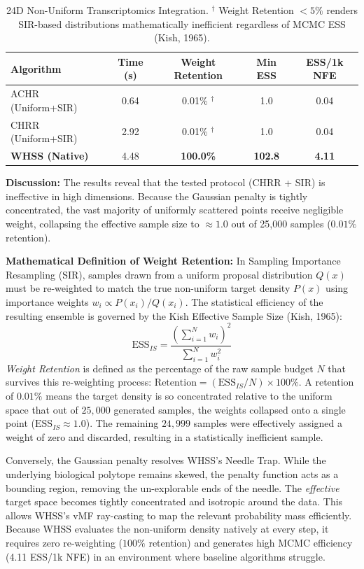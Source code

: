 \documentclass[12pt]{article}
\begin{document}
\begin{table}[H]
\centering
\begin{tabular}{l|ccc|c}
\toprule
\textbf{Algorithm} & \textbf{Time (s)} & \textbf{Weight Retention} & \textbf{Min ESS} & \textbf{ESS/1k NFE} \\
\midrule
ACHR (Uniform+SIR) & 0.64 & 0.01\% $^\dagger$ & 1.0 & 0.04 \\
CHRR (Uniform+SIR) & 2.92 & 0.01\% $^\dagger$ & 1.0 & 0.04 \\
\textbf{WHSS (Native)} & 4.48 & \textbf{100.0\%} & \textbf{102.8} & \textbf{4.11} \\
\bottomrule
\end{tabular}
\caption{24D Non-Uniform Transcriptomics Integration. $^\dagger$ Weight Retention $<5\%$ renders SIR-based distributions mathematically inefficient regardless of MCMC ESS (Kish, 1965).}
\end{table}

\textbf{Discussion:} The results reveal that the tested protocol (CHRR + SIR) is ineffective in high dimensions. Because the Gaussian penalty is tightly concentrated, the vast majority of uniformly scattered points receive negligible weight, collapsing the effective sample size to $\approx 1.0$ out of 25,000 samples ($0.01\%$ retention). 

\textbf{Mathematical Definition of Weight Retention:}
In Sampling Importance Resampling (SIR), samples drawn from a uniform proposal distribution $Q(x)$ must be re-weighted to match the true non-uniform target density $P(x)$ using importance weights $w_i \propto P(x_i)/Q(x_i)$. The statistical efficiency of the resulting ensemble is governed by the Kish Effective Sample Size (Kish, 1965):
\[
\text{ESS}_{IS} = \frac{\left(\sum_{i=1}^N w_i\right)^2}{\sum_{i=1}^N w_i^2}
\]
\emph{Weight Retention} is defined as the percentage of the raw sample budget $N$ that survives this re-weighting process: $\text{Retention} = (\text{ESS}_{IS} / N) \times 100\%$. 
A retention of $0.01\%$ means the target density is so concentrated relative to the uniform space that out of $25{,}000$ generated samples, the weights collapsed onto a single point ($\text{ESS}_{IS} \approx 1.0$). The remaining $24{,}999$ samples were effectively assigned a weight of zero and discarded, resulting in a statistically inefficient sample.

Conversely, the Gaussian penalty resolves WHSS's Needle Trap. While the underlying biological polytope remains skewed, the penalty function acts as a bounding region, removing the un-explorable ends of the needle. The \emph{effective} target space becomes tightly concentrated and isotropic around the data. This allows WHSS's vMF ray-casting to map the relevant probability mass efficiently. Because WHSS evaluates the non-uniform density natively at every step, it requires zero re-weighting ($100\%$ retention) and generates high MCMC efficiency (4.11 ESS/1k NFE) in an environment where baseline algorithms struggle.
\end{document}
